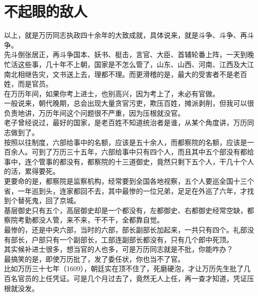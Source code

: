 \section{不起眼的敌人}
\ifnum{}
	\begin{multicols}{\theparacolNo}
\fi
以上，就是万历同志执政四十余年的大致成就，具体说来，就是斗争、斗争、再斗争。\\

先斗倒张居正，再斗争国本、妖书、梃击，言官、大臣、首辅轮番上阵，一天到晚忙活这些事，几十年不上朝，国家是不怎么管了，山东、山西、河南、江西及大江南北相继告灾，文书送上去，理都不理。而更滑稽的是，最大的受害者不是老百姓，而是官员。\\

在万历年间，如果你考上进士，也别高兴，因为考上了，未必有官做。\\

一般说来，朝代晚期，总会出现大量贪官污吏，欺压百姓，摊派剥削，但我可以很负责地讲，万历年间这个问题很不严重，因为压根就没官。\\

老子曾经说过，最好的国家，是老百姓不知道统治者是谁，从某个角度讲，万历同志做到了。\\

按照以往制度，六部给事中的名额，应该是五十余人，而都察院的名额，应该是一百余人。可到了万历三十五年，六部给事中只有四个人，而且其中五个部没有都给事中，连个管事的都没有，都察院的十三道御史，竟然只剩下五个人，干几十个人的活，累得要死。\\

更要命的是，都察院是监察机构，经常要到全国各地视察，五个人要巡全国十三个省，一年巡到头，连家都回不去，其中最惨的一位兄弟，足足在外巡了六年，才找到个替死鬼，回了京城。\\

基层御史只有五个，高层御史却是一个都没有，左都御史、右都御史经常空缺，都察院考勤都没人管，来不来，干不干，全都靠自觉。\\

最惨的，还是中央六部，当时的六部，部长副部长加起来，一共只有四个。礼部没有部长，户部只有一个副部长，工部连副部长都没有，只有几个郎中死顶。\\

其实候补进士很多，想当官的人也多，可是万历同志就是不批，你能咋办？\\

最搞笑的是，即使万历批了，发了委任状，你也当不了官。\\

比如万历三十七年（1609），朝廷实在顶不住了，死磨硬泡，才让万历先生批了几百名官员的上任凭证。可是几个月过去了，竟然无人上任，再一查才知道，凭证压根就没发。\\


\end{multicols}
